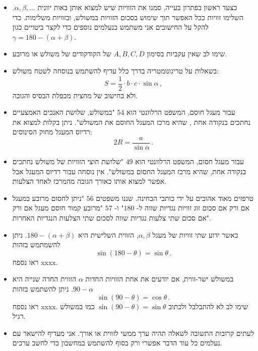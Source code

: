 \begin{itemize}

\item
כצעד ראשון בפתרון בעייה, סמנו את הזוויות שיש למצוא אותן באות יוונית
$\alpha,\beta,\ldots$.
השלימו זוויות ככל האפשר תוך שימוש בסכום הזוויות במשולש, ובזוויות משלימות. כדי להקל על החישובים אני משתמש בנעלמים נוספים כדי לקצר ביטויים כגון
$\gamma=180-(\alpha+\beta)$.

\item
שימו לב שאין עקביות בסימון 
$A,B,C,D$
של הקודקודים של משולש או מרובע.


\item 
בשאלות על טריגונומטריה בדרך כלל עדיף להשתמש בנוסחה לשטח משולש:
\[
S=\frac{1}{2}\cdot b \cdot c \cdot\sin \alpha\,,
\]
ולא בחישוב של מחצית מכפלת הבסיס והגובה.

\item
עבור מעגל חוסם, המשפט הרלוונטי הוא
$54$
"במשולש, שלושת האנכים האמצעיים נחתכים בנקודה אחת , שהיא מרכז המעגל החוסם את המשולש". ניתן בקלות למצוא את רדיוס המעגל מחוק הסינוסים:
\[
2R=\frac{a}{\sin\alpha}\,.
\]
\vspace{-4ex}
\item
עבור מעגל חסום, המשפט הרלוונטי הוא
$49$
"שלושת חוצי הזוויות של משולש נחתכים בנקודה אחת, שהיא מרכז המעגל החסום במשולש". אין נוסחה עבור רדיוס המעגל אבל אפשר למצוא אותו כאורך הגובה מהמרכז לאחד הצלעות.


\item 
טרפזים מאוד אהובים על ידי כותבי הבחינה. שננו משפטים
$56$
"ניתן לחסום מרובע במעגל אם ורק אם סכום זוג זוויות נגדיות שווה ל-%
$180$"
ו-%
$57$
"מרובע קמור חוסם מעגל אם ורק אם סכום שתי צלעות נגדיות שווה לסכום שתי הצלעות הנגדיות האחרות".

\item
כאשר ידוע שתי זוויות של מעגל
$\alpha,\beta$,
 הזווית השלישית היא
$180-(\alpha+\beta)$.
ניתן להשמתמש בזהות
\[
\sin (180-\theta) = \sin \theta\,.
\]
ראו נספח xxxx.
\item
במשולש ישר-זווית, אם יודעים את אחת הזוויות החדות 
$\alpha$
הזווית החדה שנייה היא
$90-\alpha$.
ניתן להשתמש בזהות
\[
\sin (90-\theta) = \cos \theta\,.
\]
ראו נספח xxxx. שימו לב לא להתבלבל ולכתוב
$\sin (90-\theta) = \sin\theta$
כמו במשולש רגיל.
\item
לעתים קרובות התשובה לשאלה תהיה ערך ממשי לזווית או אורך. אני מעדיף להישאר עם נעלמים כל עוד הדבר אפשרי ורק בסוף להשתמש במחשבון כדי לחשב ערכים.


\end{itemize}


